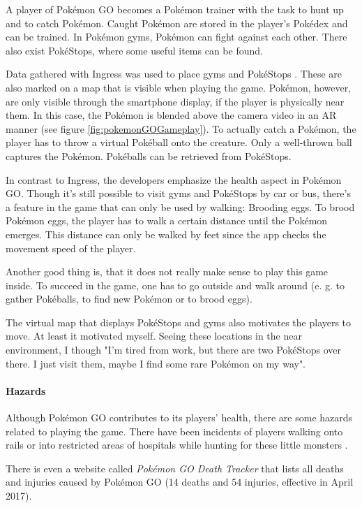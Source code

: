 A player of Pok\'{e}mon GO becomes a Pok\'{e}mon trainer with the task to hunt up and to catch Pok\'{e}mon. Caught Pok\'{e}mon are stored in the player's Pok\'{e}dex and can be trained. In Pok\'{e}mon gyms, Pok\'{e}mon can fight against each other. There also exist Pok\'{e}Stops, where some useful items can be found.

Data gathered with Ingress was used to place gyms and Pok\'{e}Stops \citep{Ingress}. These are also marked on a map that is visible when playing the game. Pok\'{e}mon, however, are only visible through the smartphone display, if the player is physically near them. In this case, the Pok\'{e}mon is blended above the camera video in an AR manner (see figure \ref{fig:pokemonGOGameplay}).
To actually catch a Pok\'{e}mon, the player has to throw a virtual Pok\'{e}ball onto the creature. Only a well-thrown ball captures the Pok\'{e}mon. Pok\'{e}balls can be retrieved from Pok\'{e}Stops.

In contrast to Ingress, the developers emphasize the health aspect in Pok\'{e}mon GO. Though it's still possible to visit gyms and Pok\'{e}Stops by car or bus, there's a feature in the game that can only be used by walking: Brooding eggs. To brood Pok\'{e}mon eggs, the player has to walk a certain distance until the Pok\'{e}mon emerges. This distance can only be walked by feet since the app checks the movement speed of the player.

Another good thing is, that it does not really make sense to play this game inside. To succeed in the game, one has to go outside and walk around (e. g. to gather Pok\'{e}balls, to find new Pok\'{e}mon or to brood eggs).

The virtual map that displays Pok\'{e}Stops and gyms also motivates the players to move. At least it motivated myself. Seeing these locations in the near environment, I though "I'm tired from work, but there are two Pok\'{e}Stops over there. I just visit them, maybe I find some rare Pok\'{e}mon on my way".

\paragraph{Hazards}
Although Pok\'{e}mon GO contributes to its players' health, there are some hazards related to playing the game. There have been incidents of players walking onto rails or into restricted areas of hospitals while hunting for these little monsters \citep{pokemonGORailway}.

There is even a website called \emph{Pok\'{e}mon GO Death Tracker} \citep{PokemonGoDeathTracker} that lists all deaths and injuries caused by Pok\'{e}mon GO (14 deaths and 54 injuries, effective in April 2017).

